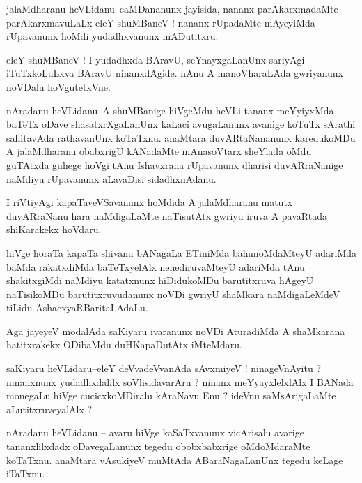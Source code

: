 \documentclass{article}
\begin{document}
\begin{mn}%
jalaMdharanu heVLidanu--caMDananunx jayisida, nananx parAkarxmadaMte parAkarxmavuLaLx eleY 
shuMBaneV ! nananx rUpadaMte mAyeyiMda rUpavanunx hoMdi yudadhxvanunx mADutitxru.
\end{mn}

\begin{mn}%
eleY shuMBaneV ! I yudadhxda BAravU, seYnayxgaLanUnx sariyAgi iTuTxkoLuLxva BAravU 
ninanxdAgide. nAnu A manoVharaLAda gwriyanunx noVDalu hoVgutetxVne.
\end{mn}

\begin{mn}%
nAradanu heVLidanu--A shuMBanige hiVgeMdu heVLi tananx meYyiyxMda baTeTx oDave 
shasatxrXgaLanUnx kaLaci avugaLanunx avanige koTuTx sArathi sahitavAda rathavanUnx 
koTaTxnu. anaMtara duvARtaNananunx karedukoMDu A jalaMdharanu obabxrigU kANadaMte 
mAnasoVtarx sheYlada oMdu guTAtxda guhege hoVgi tAnu Ishavxrana rUpavanunx dharisi 
duvARraNanige naMdiyu rUpavanunx aLavaDisi sidadhxnAdanu.
\end{mn}

\begin{mn}%
I riVtiyAgi kapaTaveVSavanunx hoMdida A jalaMdharanu matutx duvARraNanu hara naMdigaLaMte 
naTisutAtx gwriyu iruva A pavaRtada shiKarakekx hoVdaru.
\end{mn}

\begin{mn}%
hiVge horaTa kapaTa shivanu bANagaLa ETiniMda bahunoMdaMteyU adariMda baMda rakatxdiMda 
baTeTxyelAlx nenediruvaMteyU adariMda tAnu shakitxgiMdi naMdiyu katatxnunx hiDidukoMDu 
barutitxruva hAgeyU naTisikoMDu barutitxruvudanunx noVDi gwriyU shaMkara naMdigaLeMdeV 
tiLidu AshacxyaRBaritaLAdaLu.
\end{mn}

\begin{mn}%
Aga jayeyeV modalAda saKiyaru ivaranunx noVDi AturadiMda A shaMkarana hatitxrakekx ODibaMdu 
duHKapaDutAtx iMteMdaru.
\end{mn}

\begin{mn}%
saKiyaru heVLidaru--eleY deVvadeVvanAda sAvxmiyeV ! ninageVnAyitu ? ninanxnunx yudadhxdalilx 
soVlisidavarAru ? ninanx meYyayxlelxlAlx I BANada monegaLu hiVge cucicxkoMDiralu kAraNavu 
Enu ? ideVnu saMsArigaLaMte aLutitxruveyalAlx ?
\end{mn}

\begin{mn}%
nAradanu heVLidanu -- avaru hiVge kaSaTxvanunx vicArisalu avarige tananxlilxdadx 
oDavegaLanunx tegedu obobxbabxrige oMdoMdaraMte koTaTxnu. anaMtara vAsukiyeV muMtAda 
ABaraNagaLanUnx tegedu keLage iTaTxnu.
\end{mn}
\end{document}
